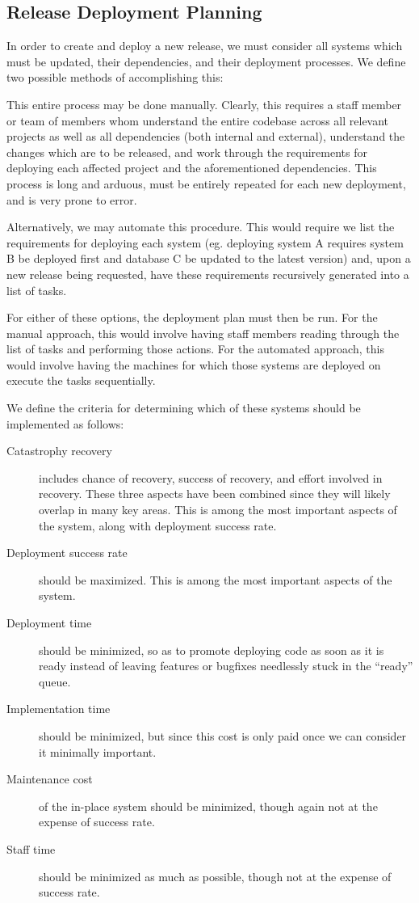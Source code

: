 \documentclass[12pt]{article}
\begin{document}
\subsection{Release Deployment Planning}
In order to create and deploy a new release, we must consider all systems which must be updated, their dependencies, and their deployment processes. We define two possible methods of accomplishing this:

This entire process may be done manually. Clearly, this requires a staff member or team of members whom understand the entire codebase across all relevant projects as well as all dependencies (both internal and external), understand the changes which are to be released, and work through the requirements for deploying each affected project and the aforementioned dependencies. This process is long and arduous, must be entirely repeated for each new deployment, and is very prone to error.

Alternatively, we may automate this procedure. This would require we list the requirements for deploying each system (eg. deploying system A requires system B be deployed first and database C be updated to the latest version) and, upon a new release being requested, have these requirements recursively generated into a list of tasks.

For either of these options, the deployment plan must then be run. For the manual approach, this would involve having staff members reading through the list of tasks and performing those actions. For the automated approach, this would involve having the machines for which those systems are deployed on execute the tasks sequentially.

We define the criteria for determining which of these systems should be implemented as follows:
\begin{description}
\item[Catastrophy recovery] includes chance of recovery, success of recovery, and effort involved in recovery. These three aspects have been combined since they will likely overlap in many key areas. This is among the most important aspects of the system, along with deployment success rate.
\item[Deployment success rate] should be maximized. This is among the most important aspects of the system.
\item[Deployment time] should be minimized, so as to promote deploying code as soon as it is ready instead of leaving features or bugfixes needlessly stuck in the ``ready'' queue.
\item[Implementation time] should be minimized, but since this cost is only paid once we can consider it minimally important.
\item[Maintenance cost] of the in-place system should be minimized, though again not at the expense of success rate.
\item[Staff time] should be minimized as much as possible, though not at the expense of success rate.
\end{description}
\end{document}
